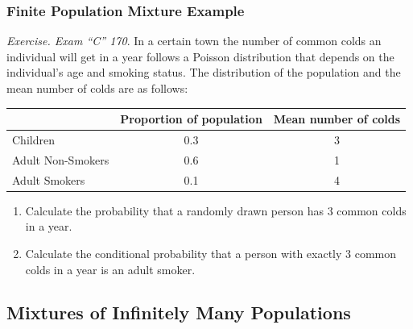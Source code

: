\documentclass[]{book}
\begin{document}
\subsubsection{Finite Population Mixture
Example}\label{finite-population-mixture-example}

\emph{Exercise. Exam ``C'' 170}. In a certain town the number of common
colds an individual will get in a year follows a Poisson distribution
that depends on the individual's age and smoking status. The
distribution of the population and the mean number of colds are as
follows:

\begin{longtable}[]{@{}lcc@{}}
\toprule
\begin{minipage}[b]{0.32\columnwidth}\raggedright\strut
\strut
\end{minipage} & \begin{minipage}[b]{0.32\columnwidth}\centering\strut
Proportion of population\strut
\end{minipage} & \begin{minipage}[b]{0.32\columnwidth}\centering\strut
Mean number of colds\strut
\end{minipage}\tabularnewline
\midrule
\endhead
Children & 0.3 & 3\tabularnewline
Adult Non-Smokers & 0.6 & 1\tabularnewline
Adult Smokers & 0.1 & 4\tabularnewline
\bottomrule
\end{longtable}

\begin{enumerate}
\def\labelenumi{\arabic{enumi}.}
\item
  Calculate the probability that a randomly drawn person has 3 common
  colds in a year.
\item
  Calculate the conditional probability that a person with exactly 3
  common colds in a year is an adult smoker.
\end{enumerate}

\subsection{Mixtures of Infinitely Many
Populations}\label{mixtures-of-infinitely-many-populations}
\end{document}
